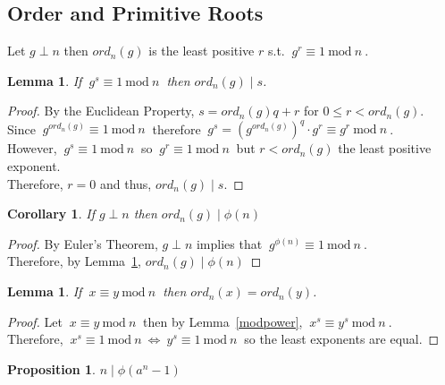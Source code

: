 \documentclass[12pt]{extarticle}
\renewcommand\qedsymbol{$\square$}
\newcommand{\divides}{\mid}
\newtheorem{lemma}[theorem]{Lemma}
\newtheorem{proposition}[theorem]{Proposition}
\newtheorem{corollary}[theorem]{Corollary}
\newenvironment{definition}[1][Definition:]{\begin{trivlist}
\item[\hskip \labelsep {\bfseries #1}]}{\end{trivlist}}
\newenvironment{lproof}{\begin{proof} \renewcommand{\qedsymbol}{}}{\end{proof}}
\renewcommand{\mod}[3]{\: #1 \equiv #2 \: \mathrm{mod} \: #3 \:}
\begin{document}
\newpage
\subsection{Order and Primitive Roots}

\begin{definition}
Let $g \perp n$ then $ord_n(g)$ is the least positive $r$ s.t. $\mod{g^r}{1}{n}$.
\end{definition}

\begin{lemma}
\label{orderdivides}
If $\mod{g^s}{1}{n}$ then $ord_n(g) \divides s$.
\end{lemma}

\begin{lproof}
By the Euclidean Property, $s = ord_n(g)q + r$ for $0 \le r < ord_n(g)$. \\ Since $\mod{g^{ord_n(g)}}{1}{n}$ therefore $\mod{g^s = (g^{ord_n(g)})^q \cdot g^r}{g^r}{n}$.\\ However, $\mod{g^s}{1}{n}$ so $\mod{g^r}{1}{n}$ but $r < ord_n(g)$ the least positive exponent. \\ Therefore, $r = 0$ and thus, $ord_n(g) \divides s$.
\end{lproof}

\begin{corollary}
\label{orderdividesphi}
If $g \perp n$ then $ord_n(g) \divides \phi (n)$
\end{corollary}

\begin{lproof}
By Euler's Theorem, $g \perp n$ implies that $\mod{g^{\phi (n)}}{1}{n}$. \\ Therefore, by Lemma~\ref{orderdivides}, $ord_n(g) \divides \phi (n)$
\end{lproof}

\begin{lemma}
\label{congruentorders}
If $\mod{x}{y}{n}$ then $ord_n(x) = ord_n(y)$.
\end{lemma}

\begin{lproof}
Let $\mod{x}{y}{n}$ then by Lemma~\ref{modpower}, $\mod{x^s}{y^s}{n}$. \\ Therefore, $\mod{x^s}{1}{n} \iff\mod{y^s}{1}{n}$ so the least exponents are equal.
\end{lproof}

\begin{proposition}
$n \divides \phi (a^n - 1)$
\end{proposition}
\end{document}
